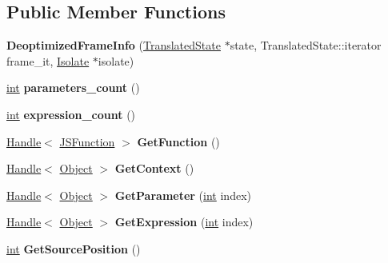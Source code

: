 \subsection*{Public Member Functions}
\begin{DoxyCompactItemize}
\item 
\mbox{\label{classv8_1_1internal_1_1DeoptimizedFrameInfo_abcd9e3b305e42e71e91aa22fd0e74efc}} 
{\bfseries Deoptimized\+Frame\+Info} (\mbox{\hyperlink{classv8_1_1internal_1_1TranslatedState}{Translated\+State}} $\ast$state, Translated\+State\+::iterator frame\+\_\+it, \mbox{\hyperlink{classv8_1_1internal_1_1Isolate}{Isolate}} $\ast$isolate)
\item 
\mbox{\label{classv8_1_1internal_1_1DeoptimizedFrameInfo_ace9c74d42d04b117979611044f6adc68}} 
\mbox{\hyperlink{classint}{int}} {\bfseries parameters\+\_\+count} ()
\item 
\mbox{\label{classv8_1_1internal_1_1DeoptimizedFrameInfo_a86000b47a892ff78f37787ed131e61c9}} 
\mbox{\hyperlink{classint}{int}} {\bfseries expression\+\_\+count} ()
\item 
\mbox{\label{classv8_1_1internal_1_1DeoptimizedFrameInfo_addf293d436f9b12f7eda3b732fc08afd}} 
\mbox{\hyperlink{classv8_1_1internal_1_1Handle}{Handle}}$<$ \mbox{\hyperlink{classv8_1_1internal_1_1JSFunction}{J\+S\+Function}} $>$ {\bfseries Get\+Function} ()
\item 
\mbox{\label{classv8_1_1internal_1_1DeoptimizedFrameInfo_a41b2845faf5e159c8164b0cc1082f77a}} 
\mbox{\hyperlink{classv8_1_1internal_1_1Handle}{Handle}}$<$ \mbox{\hyperlink{classv8_1_1internal_1_1Object}{Object}} $>$ {\bfseries Get\+Context} ()
\item 
\mbox{\label{classv8_1_1internal_1_1DeoptimizedFrameInfo_af3c4c6fbbfed06a8b4b2f765542656ea}} 
\mbox{\hyperlink{classv8_1_1internal_1_1Handle}{Handle}}$<$ \mbox{\hyperlink{classv8_1_1internal_1_1Object}{Object}} $>$ {\bfseries Get\+Parameter} (\mbox{\hyperlink{classint}{int}} index)
\item 
\mbox{\label{classv8_1_1internal_1_1DeoptimizedFrameInfo_ae2ada6861a34add80240b68c5f6ec2d1}} 
\mbox{\hyperlink{classv8_1_1internal_1_1Handle}{Handle}}$<$ \mbox{\hyperlink{classv8_1_1internal_1_1Object}{Object}} $>$ {\bfseries Get\+Expression} (\mbox{\hyperlink{classint}{int}} index)
\item 
\mbox{\label{classv8_1_1internal_1_1DeoptimizedFrameInfo_a1f7e7515df0cf92d77692f3861eeab5a}} 
\mbox{\hyperlink{classint}{int}} {\bfseries Get\+Source\+Position} ()
\end{DoxyCompactItemize}
